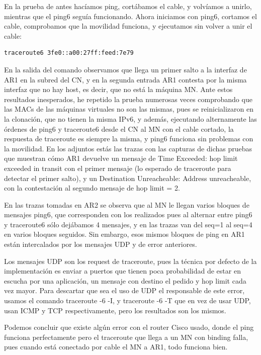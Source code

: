 \documentclass{article}
\begin{document}
En la prueba de antes hacíamos ping, cortábamos el cable, y volvíamos a unirlo, mientras que el ping6 seguía funcionando. Ahora iniciamos con ping6, cortamos el cable, comprobamos que la movilidad funciona, y ejecutamos sin volver a unir el cable:

\begin{BVerbatim}
traceroute6 3fe0::a00:27ff:feed:7e79
\end{BVerbatim}

En la salida del comando observamos que llega un primer salto a la interfaz de AR1 en la subred del CN, y en la segunda entrada AR1 contesta por la misma interfaz que no hay host, es decir, que no está la máquina MN. Ante estos resultados inesperados, he repetido la prueba numerosas veces comprobando que las MACs de las máquinas virtuales no son las mismas, pues se reinicializaron en la clonación, que no tienen la misma IPv6, y además, ejecutando alternamente las órdenes de ping6 y traceroute6 desde el CN al MN con el cable cortado, la respuesta de traceroute es siempre la misma, y ping6 funciona sin problemas con la movilidad. En los adjuntos estás las trazas con las capturas de dichas pruebas que muestran cómo AR1 devuelve un mensaje de Time Exceeded: hop limit exceeded in transit con el primer mensaje (lo esperado de traceroute para detectar el primer salto), y un Destination Unreacheable: Address unreacheable, con la contestación al segundo mensaje de hop limit = 2.

En las trazas tomadas en AR2 se observa que al MN le llegan varios bloques de mensajes ping6, que corresponden con los realizados pues al alternar entre ping6 y traceroute6 sólo dejábamos 4 mensajes, y en las trazas van del seq=1 al seq=4 en varios bloques seguidos. Sin embargo, esos mismos bloques de ping en AR1 están intercalados por los mensajes UDP y de error anteriores.

Los mensajes UDP son los request de traceroute, pues la técnica por defecto de la implementación es enviar a puertos que tienen poca probabilidad de estar en escucha por una aplicación, un mensaje con destino el pedido y hop limit cada vez mayor. Para descartar que sea el uso de UDP el responsable de este error, usamos el comando traceroute -6 -I, y traceroute -6 -T que en vez de usar UDP, usan ICMP y TCP respectivamente, pero los resultados son los mismos.

Podemos concluir que existe algún error con el router Cisco usado, donde el ping funciona perfectamente pero el traceroute que llega a un MN con binding falla, pues cuando está conectado por cable el MN a AR1, todo funciona bien.
\end{document}
